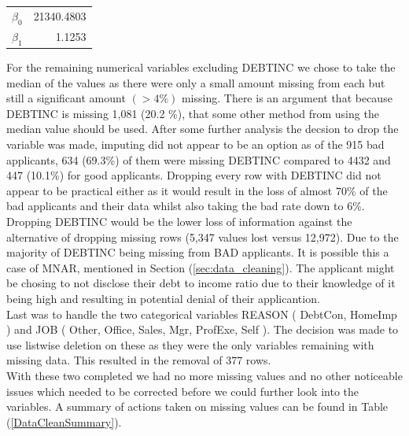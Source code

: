 \begin{table}[ht]\label{VALUE_IMPUTE_COEFS}
	\centering
	\begin{tabular}{lr}
	\hline
	$\beta_{0}$ & 21340.4803 \\
	$\beta_{1}$ & 1.1253 \\
	\hline
	\end{tabular}
\end{table}

For the remaining numerical variables excluding DEBTINC we chose to take the median of the values as there were only a small amount missing from each but still a significant amount $( > 4\% )$ missing. There is an argument that because DEBTINC is missing 1,081 (20.2 \%), that some other method from using the median value should be used. After some further analysis the decsion to drop the variable was made, imputing did not appear to be an option as of the 915 bad applicants, 634 (69.3\%) of them were missing DEBTINC compared to 4432 and 447 (10.1\%) for good applicants. Dropping every row with DEBTINC did not appear to be practical either as it would result in the loss of almost 70\% of the bad applicants and their data whilst also taking the bad rate down to 6\%. Dropping DEBTINC would be the lower loss of information against the alternative of dropping missing rows (5,347 values lost versus 12,972). Due to the majority of DEBTINC being missing from BAD applicants. It is possible this a case of MNAR, mentioned in Section (\ref{sec:data_cleaning}). The applicant might be chosing to not disclose their debt to income ratio due to their knowledge of it being high and resulting in potential denial of their applicantion. \\

Last was to handle the two categorical variables REASON ( DebtCon,  HomeImp ) and JOB ( Other,  Office,  Sales,  Mgr,  ProfExe,  Self ). The decision was made to use listwise deletion on these as they were the only variables remaining with missing data. This resulted in the removal of 377 rows. \\

With these two completed we had no more missing values and no other noticeable issues which needed to be corrected before we could further look into the variables. A summary of actions taken on missing values can be found in Table (\ref{DataCleanSummary}). \\

